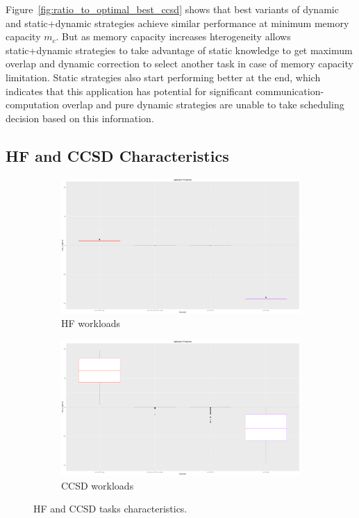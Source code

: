 \documentclass[runningheads]{llncs} %
\begin{document}
Figure~\ref{fig:ratio_to_optimal_best_ccsd} shows that best variants of dynamic and static+dynamic strategies achieve similar performance at minimum memory capacity $m_c$. But as memory capacity increases hterogeneity allows static+dynamic strategies to take advantage of static knowledge to get maximum overlap and dynamic correction to select another task in case of memory capacity limitation. Static strategies also start performing better at the end, which indicates that this application has potential for significant communication-computation overlap and pure dynamic strategies are unable to take scheduling decision based on this information.

\subsection{HF and CCSD Characteristics}


  
\begin{figure}[htb]
	\centering
	\begin{subfigure}{.5\textwidth}
		\centering
		\includegraphics[width=.95\linewidth]{../ExperimentalResults/application_properties_hf.pdf}
		\caption{HF workloads}
		\label{fig:hfProperties}
	\end{subfigure}%
	\begin{subfigure}{.5\textwidth}
		\centering
		\includegraphics[width=.95\linewidth]{../ExperimentalResults/application_properties_ccsd.pdf}
		\caption{CCSD workloads}
		\label{fig:ccsdProperties}
	\end{subfigure}
	\caption{HF and CCSD tasks characteristics.}
	\label{fig:ApplicationProperties}
\end{figure}
\end{document}
